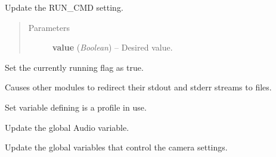 \documentclass[letterpaper,10pt,english]{sphinxmanual}
\begin{document}

\begin{fulllineitems}
\label{diwavars:diwavars.set_run_cmd}
Update the RUN\_CMD setting.
\begin{quote}\begin{description}
\item[{Parameters}] \leavevmode
\textbf{value} (\emph{Boolean}) -- Desired value.

\end{description}\end{quote}

\end{fulllineitems}


\begin{fulllineitems}
\label{diwavars:diwavars.set_running}
Set the currently running flag as true.

Causes other modules to redirect their stdout and stderr streams
to files.

\end{fulllineitems}


\begin{fulllineitems}
\label{diwavars:diwavars.set_using_diwa_profile}
Set variable defining is a profile in use.

\end{fulllineitems}


\begin{fulllineitems}
\label{diwavars:diwavars.update_audio}
Update the global Audio variable.

\end{fulllineitems}


\begin{fulllineitems}
\label{diwavars:diwavars.update_camera_vars}
Update the global variables that control the camera settings.

\end{fulllineitems}
\end{document}
